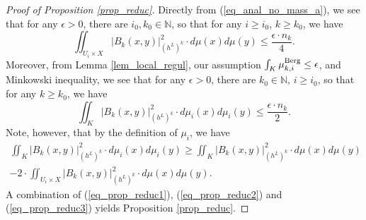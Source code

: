\documentclass[12pt]{article}
\numberwithin{equation}{section}
\theoremstyle{theorem}
\theoremstyle{definition}
\theoremstyle{remark}
\newcommand{\nat}{\mathbb{N}}
\begin{document}
	\begin{proof}[Proof of Proposition \ref{prop_reduc}]
		Directly from (\ref{eq_anal_no_mass_a}), we see that for any $\epsilon > 0$, there are $i_0, k_0 \in \nat$, so that for any $i \geq i_0$, $k \geq k_0$, we have
		\begin{equation}\label{eq_prop_reduc1}
			\iint_{U_i \times X} \big| B_k(x, y) \big|_{(h^L)^k}^2 \cdot d \mu(x) d \mu(y)
			\leq
			\frac{\epsilon \cdot n_k}{4}.
		\end{equation}
		Moreover, from Lemma \ref{lem_local_regul}, our assumption $\int_K \mu_{k, i}^{\rm{Berg}} \leq \epsilon$, and Minkowski inequality, we see that for any $\epsilon > 0$, there are $k_0 \in \nat$, $i \geq i_0$, so that for any $k \geq k_0$, we have
		\begin{equation}\label{eq_prop_reduc2}
			 \iint_{K} \big| B_k(x, y) \big|_{(h^L)^k}^2 \cdot d \mu_i(x) d \mu_i(y)
			 \leq
			 \frac{\epsilon \cdot n_k}{2}.
		\end{equation}
		Note, however, that by the definition of $\mu_i$, we have
		\begin{multline}\label{eq_prop_reduc3}
			 \iint_{K} \big| B_k(x, y) \big|_{(h^L)^k}^2 \cdot d \mu_i(x) d \mu_i(y)
			 \geq
			 \iint_{K} \big| B_k(x, y) \big|_{(h^L)^k}^2 \cdot d \mu(x) d \mu(y)
			 \\
			 -
			 2 \cdot \iint_{U_i \times X} \big| B_k(x, y) \big|_{(h^L)^k}^2 \cdot d \mu(x) d \mu(y).
		\end{multline}
		A combination of (\ref{eq_prop_reduc1}), (\ref{eq_prop_reduc2}) and (\ref{eq_prop_reduc3}) yields Proposition \ref{prop_reduc}.
	\end{proof}
	
\end{document}
